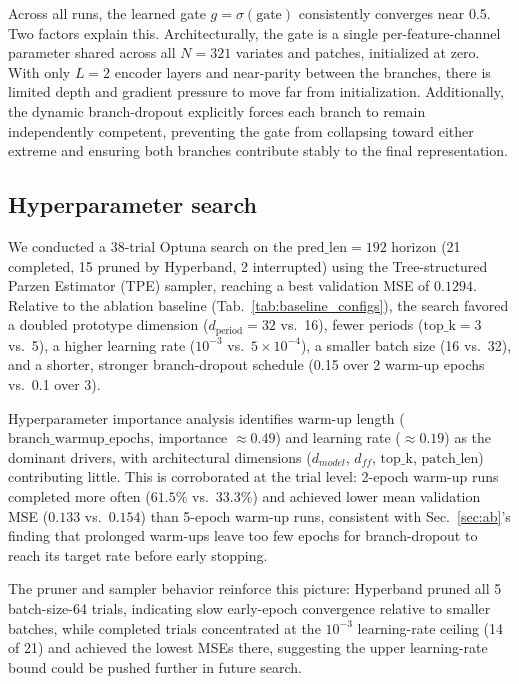 \documentclass[10pt,journal]{IEEEtran}
\newcommand{\tab}[1]{Tab.~\ref{#1}}
\newcommand{\secref}[1]{Sec.~\ref{#1}}
\begin{document}
Across all runs, the learned gate $g=\sigma(\mathrm{gate})$ consistently converges near 0.5. Two factors explain this. Architecturally, the gate is a single per-feature-channel parameter shared across all $N=321$ variates and patches, initialized at zero. With only $L=2$ encoder layers and near-parity between the branches, there is limited depth and gradient pressure to move far from initialization. Additionally, the dynamic branch-dropout explicitly forces each branch to remain independently competent, preventing the gate from collapsing toward either extreme and ensuring both branches contribute stably to the final representation.

\subsection{Hyperparameter search}
\label{sec:hp}

We conducted a 38-trial Optuna search on the $\mathrm{pred\_len}=192$ horizon (21 completed, 15 pruned by Hyperband, 2 interrupted) using the Tree-structured Parzen Estimator (TPE) sampler, reaching a best validation MSE of $0.1294$. Relative to the ablation baseline (\tab{tab:baseline_configs}), the search favored a doubled prototype dimension ($d_{\text{period}}=32$ vs.\ 16), fewer periods ($\mathrm{top\_k}=3$ vs.\ 5), a higher learning rate ($10^{-3}$ vs.\ $5\!\times\!10^{-4}$), a smaller batch size (16 vs.\ 32), and a shorter, stronger branch-dropout schedule (0.15 over 2 warm-up epochs vs.\ 0.1 over 3).

Hyperparameter importance analysis identifies warm-up length ($\mathrm{branch\_warmup\_epochs}$, importance $\approx 0.49$) and learning rate ($\approx 0.19$) as the dominant drivers, with architectural dimensions ($d_{model}$, $d_{ff}$, $\mathrm{top\_k}$, $\mathrm{patch\_len}$) contributing little. This is corroborated at the trial level: 2-epoch warm-up runs completed more often ($61.5\%$ vs.\ $33.3\%$) and achieved lower mean validation MSE ($0.133$ vs.\ $0.154$) than 5-epoch warm-up runs, consistent with \secref{sec:ab}'s finding that prolonged warm-ups leave too few epochs for branch-dropout to reach its target rate before early stopping.

The pruner and sampler behavior reinforce this picture: Hyperband pruned all 5 batch-size-64 trials, indicating slow early-epoch convergence relative to smaller batches, while completed trials concentrated at the $10^{-3}$ learning-rate ceiling (14 of 21) and achieved the lowest MSEs there, suggesting the upper learning-rate bound could be pushed further in future search.
\end{document}
